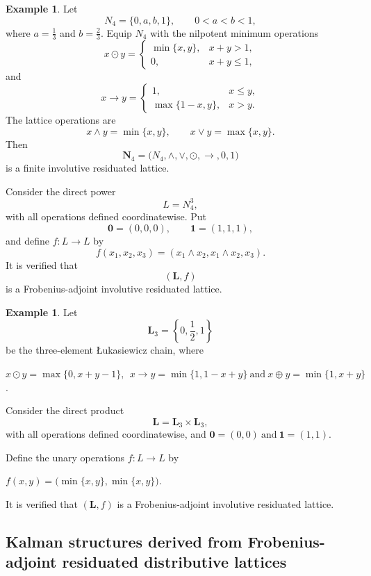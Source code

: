 \documentclass[final,12pt,times]{elsarticle}
\theoremstyle{plain}
\theoremstyle{definition}
\newtheorem{example}[definition]{Example}
\theoremstyle{break}
\begin{document}
\begin{example}
\label{ex:block-nonMV-FAIRL}
Let
\[
N_4=\{0,a,b,1\},
\qquad
0<a<b<1,
\]
where \(a=\frac13\) and \(b=\frac23\). Equip \(N_4\) with the nilpotent
minimum operations
\[
x\odot y=
\begin{cases}
\min\{x,y\}, & x+y>1,\\
0,           & x+y\leq 1,
\end{cases}
\]
and
\[
x\to y=
\begin{cases}
1,                   & x\leq y,\\
\max\{1-x,y\},        & x>y.
\end{cases}
\]
The lattice operations are
\[
x\wedge y=\min\{x,y\},
\qquad
x\vee y=\max\{x,y\}.
\]
Then
\[
\mathbf N_4
=
\bigl(N_4,\wedge,\vee,\odot,\to,0,1\bigr)
\]
is a finite involutive residuated lattice.

Consider the direct power
\[
L=N_4^3,
\]
with all operations defined coordinatewise. Put
\[
\mathbf 0=(0,0,0),
\qquad
\mathbf 1=(1,1,1),
\]
and define \(f:L\to L\) by
\[
f(x_1,x_2,x_3)
=
(x_1\wedge x_2,x_1\wedge x_2,x_3).
\]
It is verified that
\[(\mathbf{L},f)
\]
is a Frobenius-adjoint involutive residuated lattice.
\end{example}

\begin{example} Let
\[
\mathbf{L}_{3}=\left\{0,\frac12,1\right\}
\]
be the three-element \L ukasiewicz chain, where
\begin{center}
$x\odot y=\max\{0,x+y-1\},~~
x\to y=\min\{1,1-x+y\}~\text{and}~
x\oplus y=\min\{1,x+y\}$.
\end{center}

Consider the direct product
\[
\mathbf{L}=\mathbf{L}_{3}\times \mathbf{L}_{3},
\]
with all operations defined coordinatewise, and
$\mathbf{0}=(0,0)~
\text{and}
~\mathbf{1}=(1,1)$.

Define the unary operations $f\colon L\to L$ by
\begin{center}
$f(x,y)=\bigl(\min\{x,y\},\min\{x,y\}\bigr).$
\end{center}
It is verified that  $(\mathbf{L},f)$ is a Frobenius-adjoint involutive residuated lattice.
\end{example} 

\subsection{Kalman structures derived from Frobenius-adjoint residuated distributive lattices}\label{subsection:KA-FARDL}
\end{document}
